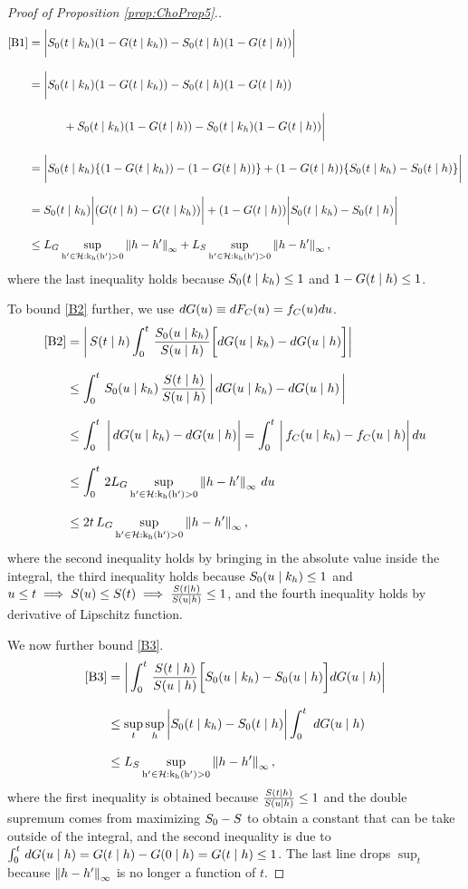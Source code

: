 \begin{proof}[Proof of Proposition \ref{prop:ChoProp5}.]
\begin{align*}
\cref{B1}
&=\bigg|\truesurv\argtgkh(1-G\argtgkh)
- \truesurv\argtgh(1-G\argtgh)
\bigg| \eqnspace
&= \bigg|\truesurv\argtgkh(1-G\argtgkh)
- \truesurv\argtgh(1-G\argtgh) \eqnspace
&\quad \quad \quad + \truesurv\argtgkh(1-G\argtgh)
- \truesurv\argtgkh(1-G\argtgh)
\bigg| \eqnspace
&= \bigg|
\truesurv\argtgkh \{(1-G\argtgkh) - (1-G\argtgh) \}
+ (1-G\argtgh) \{ \truesurv\argtgkh - \truesurv\argtgh \}
\bigg| \eqnspace
&= 
\truesurv\argtgkh \bigg| (G\argtgh - G\argtgkh) \bigg|
+ (1-G\argtgh) \bigg| \truesurv\argtgkh - \truesurv\argtgh
\bigg| \eqnspace
&\leq \lipG \suphprimekernel \normh_\infty + \lipS \suphprimekernel \normh_\infty,
\end{align*}
where the last inequality holds because $S_0(t\mid k_h) \leq 1$ and $1-G(t\mid h) \leq 1$.

To bound \cref{B2} further, we use $dG(u) \equiv dF_C(u) = f_C(u) du$.
\begin{align*}
\cref{B2} 
&=\bigg|\, \survfunc\argtgh \intzerotot  \frac{\truesurv\argugkh
}{\survfunc\argugh} 
\bigg[dG\argugkh -dG\argugh \bigg] \bigg| \eqnspace
&\leq \intzerotot  \truesurv\argugkh \, \frac{\survfunc\argtgh
}{\survfunc\argugh} \,
\bigg| \, dG\argugkh -dG\argugh \, \bigg| \eqnspace
&\leq \intzerotot \, \bigg| \, 
dG\argugkh - dG\argugh \bigg| = \intzerotot \bigg| \, 
f_C\argugkh - f_C\argugh
\bigg| \, du \eqnspace
&\leq \intzerotot 2 \lipG \suphprimekernel \normh_\infty \, du \eqnspace
&\leq 2t \, \lipG \suphprimekernel \normh_\infty,
\end{align*}
where the second inequality holds by bringing in the absolute value inside the integral, the third inequality holds because $S_0(u\mid k_h) \leq 1$ and $u\leq t \implies S(u) \leq S(t) \implies \frac{S(t\mid h)}{S(u\mid h)}\leq 1$, and the fourth inequality holds by derivative of Lipschitz function.

We now further bound \cref{B3}.
\begin{align*}
\cref{B3} &= \bigg|  \intzerotot \frac{\survfunc\argtgh}{\survfunc\argugh} 
\bigg[ \truesurv\argugkh - \truesurv\argugh \bigg] dG\argugh
\bigg| \eqnspace
&\leq \sup_t \sup_\histlower \bigg| \truesurv\argtgkh - \truesurv\argtgh \bigg| \intzerotot \, dG\argugh \eqnspace
&\leq \lipS \suphprimekernel \normh_\infty,
\end{align*}
where the first inequality is obtained because $\frac{S(t\mid h)}{S(u\mid h)}\leq 1$ and the double supremum comes from maximizing $S_0 - S$ to obtain a constant that can be take outside of the integral, and the second inequality is due to $\int_0^t\, dG(u\mid h) = G(t\mid h) - G(0\mid h) = G(t\mid h) \leq 1$. The last line drops $\sup_t$ because $\left\lVert h - h^{\prime}\right\rVert_\infty$ is no longer a function of $t$.


\end{proof}
